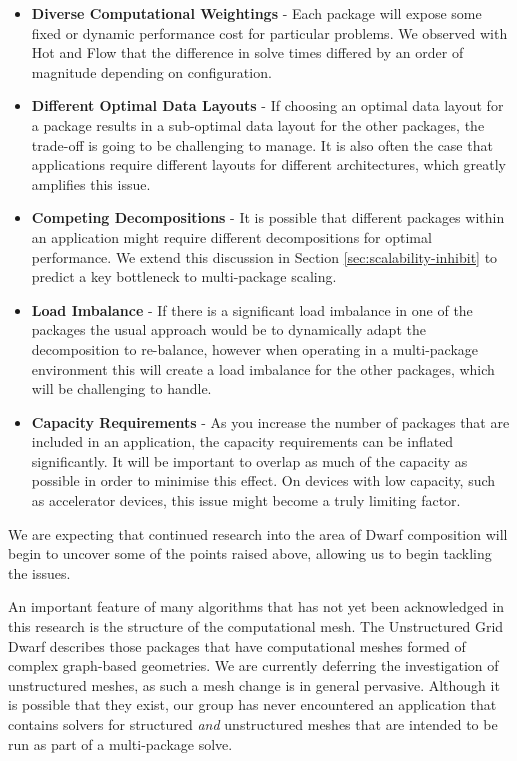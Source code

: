 \documentclass[runningheads,a4paper]{llncs}
\begin{document}
\begin{itemize}
  \item \textbf{Diverse Computational Weightings} - Each package will expose some fixed or dynamic performance cost for particular problems. We observed with Hot and Flow that the difference in solve times differed by an order of magnitude depending on configuration.
  \item \textbf{Different Optimal Data Layouts} - If choosing an optimal data layout for a package results in a sub-optimal data layout for the other packages, the trade-off is going to be challenging to manage. It is also often the case that applications require different layouts for different architectures, which greatly amplifies this issue. 
  \item \textbf{Competing Decompositions} - It is possible that different packages within an application might require different decompositions for optimal performance. We extend this discussion in Section \ref{sec:scalability-inhibit} to predict a key bottleneck to multi-package scaling.
  \item \textbf{Load Imbalance} - If there is a significant load imbalance in one of the packages the usual approach would be to dynamically adapt the decomposition to re-balance, however when operating in a multi-package environment this will create a load imbalance for the other packages, which will be challenging to handle.
  \item \textbf{Capacity Requirements} - As you increase the number of packages that are included in an application, the capacity requirements can be inflated significantly. It will be important to overlap as much of the capacity as possible in order to minimise this effect. On devices with low capacity, such as accelerator devices, this issue might become a truly limiting factor.
\end{itemize}

We are expecting that continued research into the area of Dwarf composition will begin to uncover some of the points raised above, allowing us to begin tackling the issues.

An important feature of many algorithms that has not yet been acknowledged in this research is the structure of the computational mesh. The Unstructured Grid Dwarf describes those packages that have computational meshes formed of complex graph-based geometries. We are currently deferring the investigation of unstructured meshes, as such a mesh change is in general pervasive. Although it is possible that they exist, our group has never encountered an application that contains solvers for structured \textit{and} unstructured meshes that are intended to be run as part of a multi-package solve.
\end{document}
